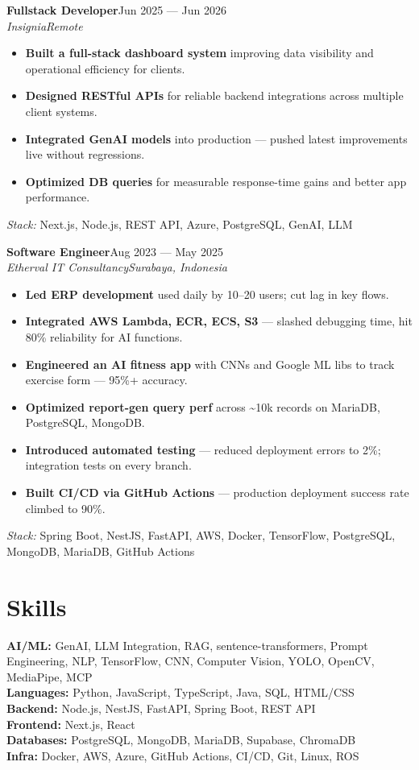 \documentclass[10pt]{article}
\newcommand{\entry}[4]{\textbf{#1}\hfill #2\\\textit{#3}\hfill\textit{#4}\par}
\begin{document}
\entry{Fullstack Developer}{Jun 2025 — Jun 2026}{Insignia}{Remote}
\begin{itemize}
  \item \textbf{Built a full-stack dashboard system} improving data visibility and operational efficiency for clients.
  \item \textbf{Designed RESTful APIs} for reliable backend integrations across multiple client systems.
  \item \textbf{Integrated GenAI models} into production — pushed latest improvements live without regressions.
  \item \textbf{Optimized DB queries} for measurable response-time gains and better app performance.
\end{itemize}
{\small\textit{Stack:} Next.js, Node.js, REST API, Azure, PostgreSQL, GenAI, LLM}\par\medskip

\entry{Software Engineer}{Aug 2023 — May 2025}{Etherval IT Consultancy}{Surabaya, Indonesia}
\begin{itemize}
  \item \textbf{Led ERP development} used daily by 10–20 users; cut lag in key flows.
  \item \textbf{Integrated AWS Lambda, ECR, ECS, S3} — slashed debugging time, hit 80\% reliability for AI functions.
  \item \textbf{Engineered an AI fitness app} with CNNs and Google ML libs to track exercise form — 95\%+ accuracy.
  \item \textbf{Optimized report-gen query perf} across \textasciitilde{}10k records on MariaDB, PostgreSQL, MongoDB.
  \item \textbf{Introduced automated testing} — reduced deployment errors to 2\%; integration tests on every branch.
  \item \textbf{Built CI/CD via GitHub Actions} — production deployment success rate climbed to 90\%.
\end{itemize}
{\small\textit{Stack:} Spring Boot, NestJS, FastAPI, AWS, Docker, TensorFlow, PostgreSQL, MongoDB, MariaDB, GitHub Actions}\par\medskip

\section{Skills}
\textbf{AI/ML:} GenAI, LLM Integration, RAG, sentence-transformers, Prompt Engineering, NLP, TensorFlow, CNN, Computer Vision, YOLO, OpenCV, MediaPipe, MCP\\
\textbf{Languages:} Python, JavaScript, TypeScript, Java, SQL, HTML/CSS\\
\textbf{Backend:} Node.js, NestJS, FastAPI, Spring Boot, REST API\\
\textbf{Frontend:} Next.js, React\\
\textbf{Databases:} PostgreSQL, MongoDB, MariaDB, Supabase, ChromaDB\\
\textbf{Infra:} Docker, AWS, Azure, GitHub Actions, CI/CD, Git, Linux, ROS
\end{document}
